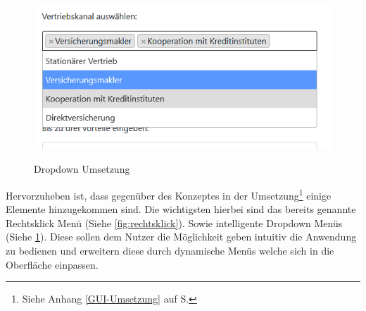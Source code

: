 \begin{figure}[hbt]
\centering
\begin{minipage}[t]{1\textwidth}
    \caption{Dropdown Umsetzung}
    \includegraphics[width=1\textwidth]{img/dropdown-umsetzung.png}\\
    \label{fig:dropdown}
\end{minipage}
\end{figure}

Hervorzuheben ist, dass gegenüber des Konzeptes in der Umsetzung\footnote{Siehe Anhang \ref{GUI-Umsetzung} auf S.\pageref{GUI-Umsetzung}} einige Elemente hinzugekommen sind. Die wichtigsten hierbei sind das bereits genannte Rechtsklick Menü (Siehe \cref{fig:rechtsklick}). Sowie intelligente Dropdown Menüs (Siehe \cref{fig:dropdown}).
Diese sollen dem Nutzer die Möglichkeit geben intuitiv die Anwendung zu bedienen und erweitern diese durch dynamische Menüs welche sich in die Oberfläche einpassen.
